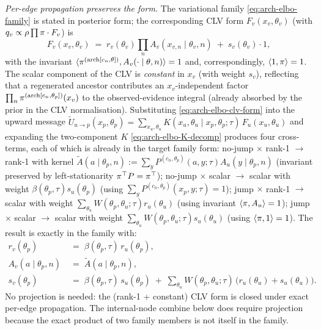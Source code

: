 \emph{Per-edge propagation preserves the form.} The variational
family \eqref{eq:arch-elbo-family} is stated in posterior form; the
corresponding CLV form $F_v(x_v, \theta_v)$ (with $q_v \propto
\rho \prod \pi \cdot F_v$) is
\begin{equation}
F_v(x_v, \theta_v) \;=\; r_v(\theta_v) \prod_n A_v(x_{v, n} \mid \theta_v, n)
    \;+\; s_v(\theta_v) \cdot 1,
\label{eq:arch-elbo-clv-form}
\end{equation}
with the invariant $\langle \pi^{(\mathrm{arch}[c_n, \theta])}, A_v(\cdot
\mid \theta, n) \rangle = 1$ and, correspondingly, $\langle 1, \pi
\rangle = 1$. The scalar component of the CLV is \emph{constant}
in $x_v$ (with weight $s_v$), reflecting that a regenerated ancestor
contributes an $x_v$-independent factor $\prod_n \pi^{(\mathrm{arch}[c_n,
\theta_p])}(x_v)$ to the observed-evidence integral (already absorbed
by the prior in the CLV normalisation). Substituting
\eqref{eq:arch-elbo-clv-form} into the upward message
$\widetilde U_{u \to p}(x_p, \theta_p) = \sum_{x_u, \theta_u}
K(x_u, \theta_u \mid x_p, \theta_p; \tau)\,F_u(x_u, \theta_u)$
and expanding the two-component $K$
\eqref{eq:arch-elbo-K-decomp} produces four cross-terms, each of
which is already in the target family form: no-jump $\times$ rank-1
$\to$ rank-1 with kernel $\widetilde A(a \mid \theta_p, n) := \sum_y
P^{(c_n, \theta_p)}(a, y; \tau) A_u(y \mid \theta_p, n)$ (invariant
preserved by left-stationarity $\pi^\top P = \pi^\top$); no-jump
$\times$ scalar $\to$ scalar with weight $\beta(\theta_p, \tau)
s_u(\theta_p)$ (using $\sum_y P^{(c_n, \theta_p)}(x_p, y; \tau) = 1$);
jump $\times$ rank-1 $\to$ scalar with weight $\sum_{\theta_u}
W(\theta_p, \theta_u; \tau) r_u(\theta_u)$ (using invariant $\langle
\pi, A_u \rangle = 1$); jump $\times$ scalar $\to$ scalar with weight
$\sum_{\theta_u} W(\theta_p, \theta_u; \tau) s_u(\theta_u)$ (using
$\langle \pi, 1 \rangle = 1$). The result is exactly in the family
with:
\begin{align}
r_v(\theta_p) &\;=\; \beta(\theta_p, \tau)\,r_u(\theta_p), \\
A_v(a \mid \theta_p, n) &\;=\; \widetilde A(a \mid \theta_p, n), \\
s_v(\theta_p) &\;=\; \beta(\theta_p, \tau)\,s_u(\theta_p)
    \;+\; \sum_{\theta_u} W(\theta_p, \theta_u; \tau)\,\bigl(r_u(\theta_u) + s_u(\theta_u)\bigr).
\end{align}
No projection is needed: the (rank-1 + constant) CLV form is closed
under exact per-edge propagation. The internal-node combine below
does require projection because the exact product of two family
members is not itself in the family.

